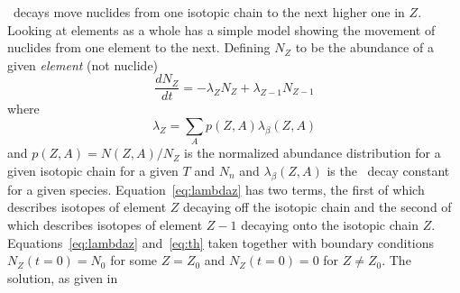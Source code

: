 
\bminus\ decays move nuclides from one isotopic chain to the next
higher one in $Z$.  Looking at elements as a whole \cite{iliadis2008}
has a simple model showing the movement of nuclides from one element
to the next.  Defining $N_Z$ to be the abundance of a given {\it
element} (not nuclide)
\begin{equation}
\label{eq:lambdaz}
\frac{dN_Z}{dt} = - \lambda_ZN_Z + \lambda_{Z-1}N_{Z-1}
\end{equation}
where
\begin{equation}
\label{eq:th}
\lambda_Z = \sum_Ap(Z,A)\lambda_\beta (Z,A)
\end{equation}
and $p(Z,A) = N(Z,A)/N_Z$ is the normalized abundance distribution for a given
isotopic chain for a given $T$ and $N_n$ and $\lambda_\beta (Z,A)$ is
the \bminus\ decay constant for a given species.
Equation~\ref{eq:lambdaz} has two terms, the first of which describes
isotopes of element $Z$ decaying off the isotopic chain and the second
of which describes isotopes of element $Z-1$ decaying onto the
isotopic chain $Z$.  Equations~\ref{eq:lambdaz} and~\ref{eq:th} taken
together with boundary conditions $N_Z(t=0)=N_0$ for some $Z=Z_0$  and
$N_Z(t=0)=0$ for $Z\neq Z_0$.  The solution, as given in
